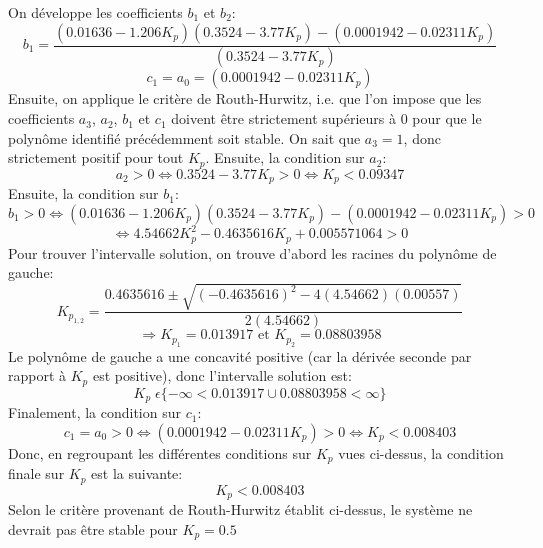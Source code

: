 On développe les coefficients $b_1$ et $b_2$:
$$b_1=\frac{(0.01636-1.206K_p)(0.3524-3.77K_p)-(0.0001942-0.02311K_p)}{(0.3524-3.77K_p)}$$
$$c_1=a_0=(0.0001942-0.02311K_p)$$
Ensuite, on applique le critère de Routh-Hurwitz, i.e. que l'on impose que les coefficients $a_3$, $a_2$, $b_1$ et $c_1$ doivent être strictement supérieurs à 0 pour que le polynôme identifié précédemment soit stable. On sait que $a_3=1$, donc strictement positif pour tout $K_p$. Ensuite, la condition sur $a_2$:
$$a_2 > 0 \Leftrightarrow 0.3524-3.77K_p > 0 \Leftrightarrow \boxed{K_p < 0.09347}$$
Ensuite, la condition sur $b_1$:
$$b_1 > 0 \Leftrightarrow (0.01636-1.206K_p)(0.3524-3.77K_p)-(0.0001942-0.02311K_p) > 0$$
$$\Leftrightarrow 4.54662K_p^2-0.4635616K_p+0.005571064 > 0$$
Pour trouver l'intervalle solution, on trouve d'abord les racines du polynôme de gauche:
$$K_{p_{1,2}}=\frac{0.4635616\pm \sqrt{(-0.4635616)^2-4(4.54662)(0.00557)}}{2(4.54662)}$$ $$\Rightarrow K_{p_1}=0.013917 \text{ et } K_{p_2}=0.08803958$$
Le polynôme de gauche a une concavité positive (car la dérivée seconde par rapport à $K_p$ est positive), donc l'intervalle solution est:
$$\boxed{K_p \; \epsilon \{-\infty < 0.013917 \cup 0.08803958 < \infty \}}$$
Finalement, la condition sur $c_1$:
$$c_1 = a_0 > 0 \Leftrightarrow (0.0001942-0.02311K_p)>0 \Leftrightarrow \boxed{K_p < 0.008403}$$
Donc, en regroupant les différentes conditions sur $K_p$ vues ci-dessus, la condition finale sur $K_p$ est la suivante:
$$\boxed{K_p < 0.008403}$$
Selon le critère provenant de Routh-Hurwitz établit ci-dessus, le système ne devrait pas être stable pour $K_p=0.5$
